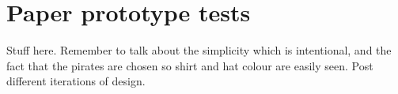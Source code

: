 \chapter{Paper prototype tests}\label{ch:visualDesign}
Stuff here.
Remember to talk about the simplicity which is intentional, and the fact that the pirates are chosen so shirt and hat colour are easily seen. Post different iterations of design.